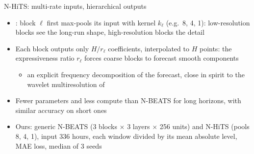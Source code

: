 \begin{frame}{N-HiTS: multi-rate inputs, hierarchical outputs}
\itemsize{\small}
\begin{itemize}
    \item {}: block $\ell$ first max-pools its input with kernel $k_\ell$ (e.g.\ 8, 4, 1): low-resolution blocks see the long-run shape, high-resolution blocks the detail
    \item Each block outputs only $H/r_\ell$ coefficients, interpolated to $H$ points: the expressiveness ratio $r_\ell$ forces coarse blocks to forecast smooth components
    \begin{itemize}
        \item an explicit frequency decomposition of the forecast, close in spirit to the wavelet multiresolution of 
    \end{itemize}
    \item Fewer parameters and less compute than N-BEATS for long horizons, with similar accuracy on short ones
    \item Ours: generic N-BEATS (3 blocks $\times$ 3 layers $\times$ 256 units) and N-HiTS (pools 8, 4, 1), input 336 hours, each window divided by its mean absolute level, MAE loss, median of 3 seeds
\end{itemize}
\end{frame}

